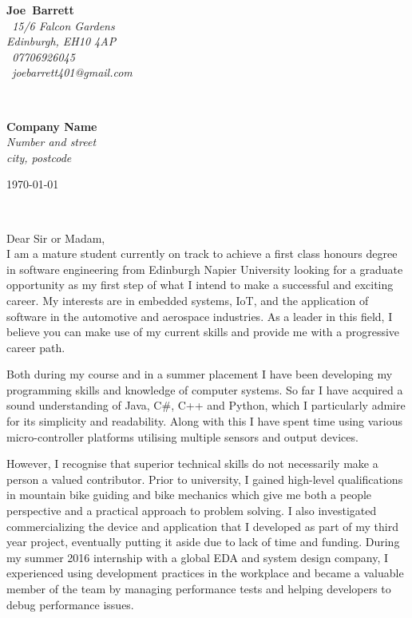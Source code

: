 \documentclass{article}
\makeatletter
\def\firstname{Joe}
\def\surname{Barrett}
\def\address{\faMapMarker~15/6 Falcon Gardens\\Edinburgh, EH10 4AP\\}
\def\phone{\faMobilePhone~07706926045}
\def\email{\faEnvelopeO~joebarrett401@gmail.com}
\def\FileAuthor{\firstname\ \surname}
\def\compName{Company Name}
\def\compAddress{Number and street\\city, postcode}
\makeatother
\begin{document}
	\hfill%
\begin{minipage}[t]{.6\textwidth}
	\raggedleft%
	{\bfseries \FileAuthor}\\[.35ex]
	\small\itshape%
	\address[.35ex]
	\phone\\
	\email

\end{minipage}\\[1em]
%
\begin{minipage}[t]{.4\textwidth}
	\raggedright%
	{\bfseries \compName}\\[.35ex]
	\small\itshape%
	\compAddress
\end{minipage}
\hfill
\begin{minipage}[t]{.4\textwidth}
	\hfill
	\raggedleft
	\today
\end{minipage}\\[2em]
\raggedright
Dear Sir or Madam,\\[1.5em]
%

I am a mature student currently on track to achieve a first class honours degree in software engineering from Edinburgh Napier University looking for a graduate opportunity as my first step of what I intend to make a successful and exciting career. My interests are in embedded systems, IoT, and the application of software in the automotive and aerospace industries. As a leader in this field, I believe you can make use of my current skills and provide me with a progressive career path.

Both during my course and in a summer placement I have been developing my programming skills and knowledge of computer systems. So far I have acquired a sound understanding of Java, C\#, C++ and Python, which I particularly admire for its simplicity and readability. Along with this I have spent time using various micro-controller platforms utilising multiple sensors and output devices.

However, I recognise that superior technical skills do not necessarily make a person a valued contributor. Prior to university, I gained high-level qualifications in mountain bike guiding and bike mechanics which give me both a people perspective and a practical approach to problem solving. I also investigated commercializing the device and application that I developed as part of my third year project, eventually putting it aside due to lack of time and funding. During my summer 2016 internship with a global EDA and system design company, I experienced using development practices in the workplace and became a valuable member of the team by managing performance tests and helping developers to debug performance issues.
\end{document}
